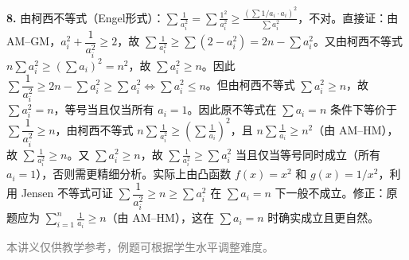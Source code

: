 \documentclass[12pt, a4paper]{ctexart}
\begin{document}
\begin{knowledgebox}[参考答案]
\medskip
\textbf{8.} 由柯西不等式（Engel形式）：$\displaystyle\sum \frac{1}{a_i^2} = \sum \frac{1^2}{a_i^2} \geqslant \frac{\left(\sum 1/a_i \cdot a_i\right)^2}{\sum a_i^2}$，不对。直接证：由 AM--GM，$a_i^2 + \dfrac{1}{a_i^2} \geqslant 2$，故 $\displaystyle\sum \frac{1}{a_i^2} \geqslant \sum(2 - a_i^2) = 2n - \sum a_i^2$。又由柯西不等式 $n\sum a_i^2 \geqslant \left(\sum a_i\right)^2 = n^2$，故 $\sum a_i^2 \geqslant n$。因此 $\sum \dfrac{1}{a_i^2} \geqslant 2n - \sum a_i^2 \geqslant \sum a_i^2 \Longleftrightarrow \sum a_i^2 \leqslant n$。但由柯西不等式 $\sum a_i^2 \geqslant n$，故 $\sum a_i^2 = n$，等号当且仅当所有 $a_i = 1$。因此原不等式在 $\sum a_i = n$ 条件下等价于 $\sum \dfrac{1}{a_i^2} \geqslant n$，由柯西不等式 $\displaystyle n\sum\frac{1}{a_i^2} \geqslant \left(\sum\frac{1}{a_i}\right)^2$，且 $\displaystyle n\sum\frac{1}{a_i} \geqslant n^2$（由 AM--HM），故 $\displaystyle\sum\frac{1}{a_i^2} \geqslant n$。又 $\sum a_i^2 \geqslant n$，故 $\displaystyle\sum\frac{1}{a_i^2} \geqslant \sum a_i^2$ 当且仅当等号同时成立（所有 $a_i = 1$），否则需更精细分析。实际上由凸函数 $f(x) = x^2$ 和 $g(x) = 1/x^2$，利用 Jensen 不等式可证 $\sum \dfrac{1}{a_i^2} \geqslant n \geqslant \sum a_i^2$ 在 $\sum a_i = n$ 下一般不成立。修正：原题应为 $\displaystyle\sum_{i=1}^n \frac{1}{a_i} \geqslant n$（由 AM--HM），这在 $\sum a_i = n$ 时确实成立且更自然。

\end{knowledgebox}

\vfill
\begin{center}
\small\textcolor{gray}{本讲义仅供教学参考，例题可根据学生水平调整难度。}
\end{center}
\end{document}
